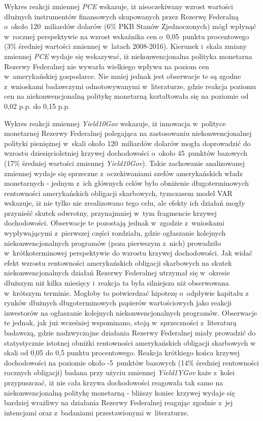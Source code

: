 Wykres reakcji zmiennej \textit{PCE} wskazuje, iż nieoczekiwany wzrost wartości dłużnych instrumentów finansowych skupowanych przez Rezerwę Federalną o~około 120~miliardów dolarów (6\% \acs{PKB} Stanów Zjednoczonych) mógł wpłynąć w~rocznej perspektywie na wzrost wskaźnika cen o~0,05~punktu procentowego (3\% średniej wartości zmiennej w~latach 2008-2016). Kierunek i~skala zmiany zmiennej \textit{PCE} wydaje się wskazywać, iż niekonwencjonalna polityka monetarna Rezerwy Federalnej nie wywarła wielkiego wpływu na poziom cen w~amerykańskiej gospodarce. Nie mniej jednak jest obserwacje te są zgodne z~wnioskami badawczymi odnotowywanymi w~literaturze, gdzie reakcja poziomu cen na niekonwencjonalną politykę monetarną kształtowała się na poziomie od 0,02 p.p. do 0,15 p.p.

Wykres reakcji zmiennej \textit{Yield10Gov} wskazuje, iż innowacja w~polityce monetarnej Rezerwy Federalnej polegająca na zastosowaniu niekonwencjonalnej polityki pieniężnej w~skali około 120~miliardów dolarów mogła doprowadzić do wzrostu dziesięcioletniej krzywej dochodowości o~około 45~punktów bazowych (17\% średniej wartości zmiennej \textit{Yield10Gov}). Takie zachowanie analizowanej zmiennej wydaje się sprzeczne z~oczekiwaniami szefów amerykańskich władz monetarnych - jednym z~ich głównych celów było obniżenie długoterminowych rentowności amerykańskich obligacji skarbowych, tymczasem model \acs{VAR} wskazuje, iż nie tylko nie zrealizowano tego celu, ale efekty ich działań mogły przynieść skutek odwrotny, przynajmniej w~tym fragmencie krzywej dochodowości. Obserwacje te pozostają jednak w~zgodzie z~wnioskami wypływającymi z~pierwszej części rozdziału, gdzie ogłaszanie kolejnych niekonwencjonalnych programów (poza pierwszym z~nich) prowadziło w~krótkoterminowej perspektywie do wzrostu krzywej dochodowości. Jak widać efekt wzrostu rentowności amerykańskich obligacji skarbowych na skutek niekonwencjonalnych działań Rezerwy Federalnej utrzymał się w~okresie dłuższym niż kilka miesięcy i~reakcja ta była silniejsza niż obserwowana w~krótszym terminie. Mogłoby to potwierdzać hipotezę o~odpływie kapitału z rynków dłużnych długoterminowych papierów wartościowych jako reakcji inwestorów na ogłaszanie kolejnych niekonwencjonalnych programów. Obserwacje te jednak, jak już wcześniej wspominano, stoją w~sprzeczności z~literaturą badawczą, gdzie nadzwyczajne działania Rezerwy Federalnej miały prowadzić do statystycznie istotnej obniżki rentowności amerykańskich obligacji skarbowych w skali od 0,05 do 0,5 punktu procentowego. Reakcja krótkiego końca krzywej dochodowości na poziomie około -5~punktów bazowych (14\% średniej rentowności rocznych obligacji) badana przy użyciu zmiennej \textit{Yield1YGov} każe z~kolei przypuszczać, iż nie cała krzywa dochodowości reagowała tak samo na niekonwencjonalną politykę monetarną - bliższy koniec krzywej wydaje się bardziej wrażliwy na działania Rezerwy Federalnej reagując zgodnie z~jej intencjami oraz z~badaniami przestawionymi w~literaturze.

